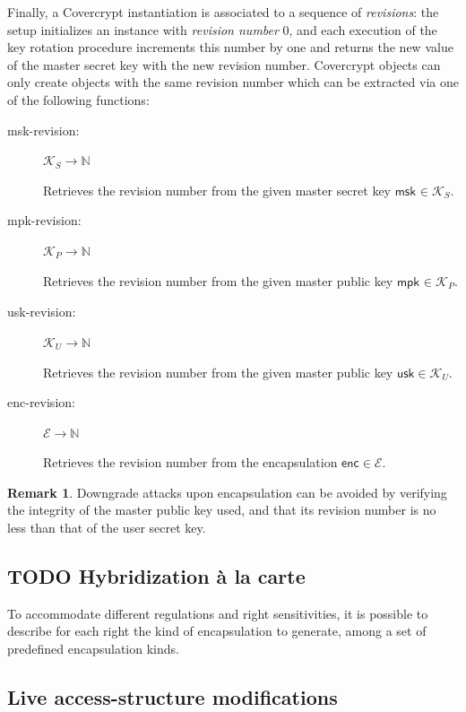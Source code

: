 \documentclass[a4paper]{article}
\theoremstyle{definition}
\newtheorem*{remark}{Remark}
\newcommand{\msk}[1]{\mathsf{msk}_{#1}}
\newcommand{\mpk}[1]{\mathsf{mpk}_{#1}}
\newcommand{\sfusk}{\mathsf{usk}}
\newcommand{\sfenc}{\mathsf{enc}}
\newcommand{\cE}{\mathcal{E}}
\newcommand{\cK}{\mathcal{K}}
\newcommand{\bN}{\mathbb{N}}
\begin{document}
Finally, a Covercrypt instantiation is  associated to a sequence of \emph{revisions}:
the setup initializes  an instance with \emph{revision number} 0,  and each execution
of the key rotation procedure increments this  number by one and returns the new
value of the master secret key with the new revision number.  Covercrypt objects
can only create objects with the same revision number which can be extracted via
one of the following functions:
\begin{description}
\item[{msk-revision:}] \(\cK_S \rightarrow \bN\)

Retrieves the  revision number from  the given  master secret key  \(\msk{} \in
  \cK_S\).

\item[{mpk-revision:}] \(\cK_P \rightarrow \bN\)

Retrieves the  revision number from  the given  master public key  \(\mpk{} \in
  \cK_P\).

\item[{usk-revision:}] \(\cK_U \rightarrow \bN\)

Retrieves the  revision number from  the given  master public key  \(\sfusk \in
  \cK_U\).

\item[{enc-revision:}] \(\cE \rightarrow \bN\)

Retrieves the revision number from the encapsulation \(\sfenc \in \cE\).
\end{description}

\begin{remark}
Downgrade attacks upon  encapsulation can be avoided by  verifying the integrity
of the master public key used, and that its revision number is no less than that
of the user secret key.
\end{remark}
\subsection{{\bfseries\sffamily TODO} Hybridization à la carte}
\label{sec:org31b1db6}

To accommodate different regulations and  right sensitivities, it is possible to
describe for each  right the kind of  encapsulation to generate, among  a set of
predefined encapsulation kinds.
\subsection{Live access-structure modifications}
\label{sec:orgd2db5b9}
\end{document}
